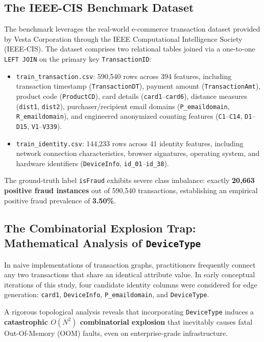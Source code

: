 \documentclass[11pt,a4paper]{article}
\begin{document}
\subsection{The IEEE-CIS Benchmark Dataset}
The benchmark leverages the real-world e-commerce transaction dataset provided by Vesta Corporation through the IEEE Computational Intelligence Society (IEEE-CIS). The dataset comprises two relational tables joined via a one-to-one \texttt{LEFT JOIN} on the primary key \texttt{TransactionID}:
\begin{itemize}[leftmargin=*]
    \item \texttt{train\_transaction.csv}: 590,540 rows across 394 features, including transaction timestamp (\texttt{TransactionDT}), payment amount (\texttt{TransactionAmt}), product code (\texttt{ProductCD}), card details (\texttt{card1}--\texttt{card6}), distance measures (\texttt{dist1}, \texttt{dist2}), purchaser/recipient email domains (\texttt{P\_emaildomain}, \texttt{R\_emaildomain}), and engineered anonymized counting features (\texttt{C1}--\texttt{C14}, \texttt{D1}--\texttt{D15}, \texttt{V1}--\texttt{V339}).
    \item \texttt{train\_identity.csv}: 144,233 rows across 41 identity features, including network connection characteristics, browser signatures, operating system, and hardware identifiers (\texttt{DeviceInfo}, \texttt{id\_01}--\texttt{id\_38}).
\end{itemize}
The ground-truth label \texttt{isFraud} exhibits severe class imbalance: exactly \textbf{20,663 positive fraud instances} out of 590,540 transactions, establishing an empirical positive fraud prevalence of \textbf{3.50\%}.

\subsection{The Combinatorial Explosion Trap: Mathematical Analysis of \texttt{DeviceType}}
In naive implementations of transaction graphs, practitioners frequently connect any two transactions that share an identical attribute value. In early conceptual iterations of this study, four candidate identity columns were considered for edge generation: \texttt{card1}, \texttt{DeviceInfo}, \texttt{P\_emaildomain}, and \texttt{DeviceType}.

A rigorous topological analysis reveals that incorporating \texttt{DeviceType} induces a \textbf{catastrophic $O(N^2)$ combinatorial explosion} that inevitably causes fatal Out-Of-Memory (OOM) faults, even on enterprise-grade infrastructure. 
\end{document}
